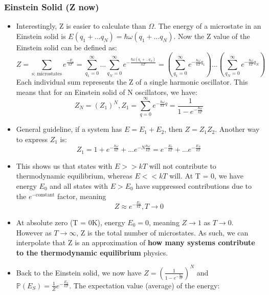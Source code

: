 \documentclass[12pt, letterpaper, twoside]{article}
\begin{document}
\subsubsection{Einstein Solid (Z now)}
\begin{itemize}
    \item Interestingly, Z is easier to calculate than $\Omega$. The energy of a microstate in an Einstein solid is $E(q_1 + ... q_N) = \hbar\omega(q_1 + ... q_N)$. Now the Z value of the Einstein solid can be defined as:
    \begin{equation*}
        Z = \sum_\text{s: microstates}e^{\frac{-E_s}{kT}} = \sum_{q_1 = 0}^{\infty}...\sum_{q_N = 0}^{\infty}e^{-\frac{\hbar\omega(q_1 + ... q_N)}{kT}} = (\sum_{q_1 = 0}^{\infty}e^{-\frac{\hbar\omega}{kT}q_1})...(\sum_{q_N = 0}^{\infty}e^{-\frac{\hbar\omega}{kT}q_N})
    \end{equation*}
    Each individual sum represents the Z of a single harmonic oscillator. This means that for an Einstein solid of N oscillators, we have:
    \begin{equation*}
        Z_N = (Z_1)^N, Z_1 = \sum_{q=0}^{\infty}e^{-\frac{\hbar\omega}{kT}q} = \frac{1}{1-e^{-\frac{\hbar\omega}{kT}}}
    \end{equation*}
    \item General guideline, if a system has $E = E_1 + E_2$, then $Z = Z_1Z_2$. Another way to express $Z_1$ is:
    \begin{equation*}
        Z_1 = 1 + e^{-\frac{\hbar\omega}{kT}} + ... e^{-N\frac{\hbar\omega}{kT}}  = e^{-\frac{E_0}{kT}} + ... e^{-\frac{E_N}{kT}}
    \end{equation*}
    \item This shows us that states with $E >> kT$ will not contribute to thermodynamic equilibrium, whereas $E << kT$ will. At T = 0, we have energy $E_0$ and all states with $E > E_0$ have suppressed contributions due to the $e^{-\text{constant}}$ factor, meaning
    \begin{equation*}
        Z \approx e^{-\frac{E_0}{kT}}, T \rightarrow 0
    \end{equation*}
    \item At absolute zero (T = 0K), energy $E_0 = 0$, meaning $Z \rightarrow 1$ as $T \rightarrow 0$. However as $T \rightarrow \infty$, Z is the total number of microstates. As such, we can interpolate that Z is an approximation of \textbf{how many systems contribute to the thermodynamic equilibrium} physics.
    \item Back to the Einstein solid, we now have $Z = (\frac{1}{1 - e^{-\frac{\hbar\omega}{kT}}})^N$ and $\mathbb{P}(E_S) = \frac{1}{Z}e^{-\frac{E_S}{kT}}$. The expectation value (average) of the energy:

\end{itemize}
\end{document}
